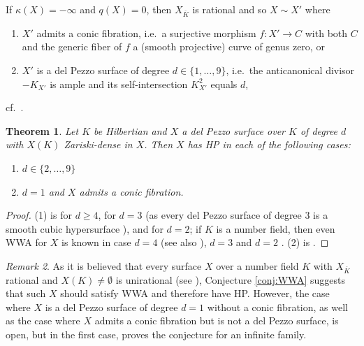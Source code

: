 \documentclass[10pt,a4paper]{amsart}
\theoremstyle{plain}
\newtheorem{theorem}{Theorem}
\theoremstyle{remark}
\newtheorem{remark}[theorem]{Remark}
\numberwithin{theorem}{section}
\begin{document}
If $\kappa(X)=-\infty$ and $q(X)=0$, then 
$X_{\overline{K}}$ is rational and so 
$X\sim X'$ where
\begin{enumerate}
 \item $X'$ admits a conic fibration,
 i.e.~a surjective morphism $f\colon X'\rightarrow C$ with 
 both $C$ and the generic fiber of $f$ a (smooth projective) curve of genus zero, or
 \item $X'$ is a del Pezzo surface of degree $d\in\{1,\dots,9\}$, i.e.~the anticanonical divisor $-K_{X'}$ is ample and its self-intersection $K_{X'}^2 $ equals $d$,  
\end{enumerate}
cf.~\cite[Corollary on p.~27]{Iskovskih}.  

\begin{theorem}\label{thm:delPezzosurfaces}
Let $K$ be Hilbertian and $X$ a del Pezzo surface over $K$
of degree $d$
with $X(K)$ Zariski-dense in $X$.
Then $X$ has HP in each of the following cases:
\begin{enumerate}
    \item $d\in\{2,\dots,9\}$
    \item $d=1$ and $X$ admits a conic fibration.
\end{enumerate}
\end{theorem}

\begin{proof}
(1) is \cite[Theorem 1.4(a)]{Streeter} for $d\geq 4$,
\cite[Corollary 3.7]{DemeioStreeterWinter}
for $d=3$
(as every del Pezzo surface of degree 3
is a smooth cubic hypersurface
\cite[Ch.~III, Thm.~3.5]{Kollar_book}), 
and \cite[Theorem~1.3]{DemeioStreeterWinter}  for $d=2$;
if $K$ is a number field, then 
even WWA for $X$ is known
in case $d=4$ 
\cite{SalbergerSkorobogatov}
(see also \cite[Corollary 1.6]{DemeioStreeter}),
$d=3$ \cite{SwinnertonDyer}
and $d=2$ \cite[Theorem 1.1]{DemeioStreeterWinter}.
(2) is \cite[Theorem 1.4(c)]{Streeter}.
\end{proof}

\begin{remark}
As it is believed that every surface $X$ over a number field $K$ with $X_{\overline{K}}$ rational and $X(K)\neq\emptyset$ is unirational
(see \cite[Problem 5.1(b)]{CT_problems}), 
Conjecture \ref{conj:WWA} suggests that such $X$ should satisfy WWA and therefore have HP.
 However, the case where $X$ is a del Pezzo surface of degree $d=1$ without a conic fibration, as well as the case where $X$ admits a conic fibration but is not a del Pezzo surface,
is open,
but in the first case, \cite[Theorem 1.5]{DSW25} 
proves the conjecture for an infinite family.
 \end{remark}
 
\end{document}
